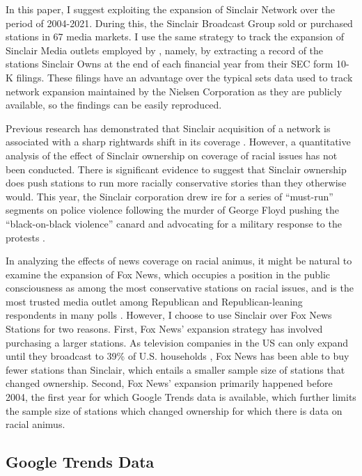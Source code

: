 \documentclass{article}
\begin{document}
In this paper, I suggest exploiting the expansion of Sinclair Network over the period of 2004-2021.
During this, the Sinclair Broadcast Group sold or purchased stations in 67 media markets.
I use the same strategy to track the expansion of Sinclair Media outlets employed by \cite{Miho_2018}, namely, by extracting a record of the stations Sinclair Owns at the end of each financial year from their SEC form 10-K filings.
These filings have an advantage over the typical sets data used to track network expansion maintained by the Nielsen Corporation as they are publicly available, so the findings can be easily reproduced.

Previous research has demonstrated that Sinclair acquisition of a network is associated with a sharp rightwards shift in its coverage \parencite[][]{Martin_2019}.
However, a quantitative analysis of the effect of Sinclair ownership on coverage of racial issues has not been conducted.
There is significant evidence to suggest that Sinclair ownership does push stations to run more racially conservative stories than they otherwise would.
This year, the Sinclair corporation drew ire for a series of ``must-run'' segments on police violence following the murder of George Floyd pushing the ``black-on-black violence'' canard and advocating for a military response to the protests \parencites{Pleat_2020_b}{Pleat_2020_a}.

In analyzing the effects of news coverage on racial animus, it might be natural to examine the expansion of Fox News, which occupies a position in the public consciousness as among the most conservative stations on racial issues, and is the most trusted media outlet among Republican and Republican-leaning respondents in many polls \parencite[][]{Jurkowitz_2020}.
However, I choose to use Sinclair over Fox News Stations for two reasons.
First, Fox News' expansion strategy has involved purchasing a larger stations.
As television companies in the US can only expand until they broadcast to 39\% of U.S. households \parencite[][]{Scherer_2018}, Fox News has been able to buy fewer stations than Sinclair, which entails a smaller sample size of stations that changed ownership.
Second, Fox News' expansion primarily happened before 2004, the first year for which Google Trends data is available, which further limits the sample size of stations which changed ownership for which there is data on racial animus.

\subsection{Google Trends Data}
\end{document}
